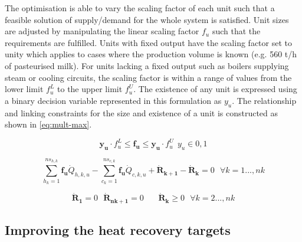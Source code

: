 The optimisation is able to vary the scaling factor of each unit such that a feasible solution of supply/demand for the whole system is satisfied. Unit sizes are adjusted by manipulating the linear scaling factor $f_u$ such that the requirements are fulfilled. Units with fixed output have the scaling factor set to unity which applies to cases where the production volume is known (e.g. 560 t/h of pasteurised milk). For units lacking a fixed output such as boilers supplying steam or cooling circuits, the scaling factor is within a range of values from the lower limit $f_{u}^{L}$ to the upper limit $f_{u}^{U}$. The existence of any unit is expressed using a binary decision variable represented in this formulation as $y_u$. The relationship and linking constraints for the size and existence of a unit is constructed as shown in \ref{eq:mult-max}.

\begin{equation}
\label{eq:mult-max}
\boldsymbol {y_u} \cdot f_{u}^L \leq \boldsymbol {f_u} \leq \boldsymbol {y_u} \cdot f_u^U  ~~ y_u \in 0,1
\end{equation}

\begin{equation}
 \label{eq:heat-cascade}
\sum_{h_k=1}^{ns_{h,k}}{\boldsymbol {f_u} \dot{Q}_{h,k,u}} - \sum_{c_k=1}^{ns_{c,k}}{\boldsymbol {f_u} \dot{Q}_{c,k,u} } +\boldsymbol {\dot{R}_{k+1}}  -\boldsymbol {\dot{R}_{k}}   = 0
~~~\forall k=1...,nk
\end{equation}



\begin{equation}
\label{eq:Rk-constraints}
\boldsymbol {\dot{R}_{1}} = 0 ~~~ \boldsymbol {\dot{R}_{nk+1}}=0 ~~~~~~~~ \boldsymbol {\dot{R}_{k}} \geq 0 ~~~\forall k=2...,nk
\end{equation}

\subsection{Improving the heat recovery targets}
\label{sec:TSIheatrecovery}

